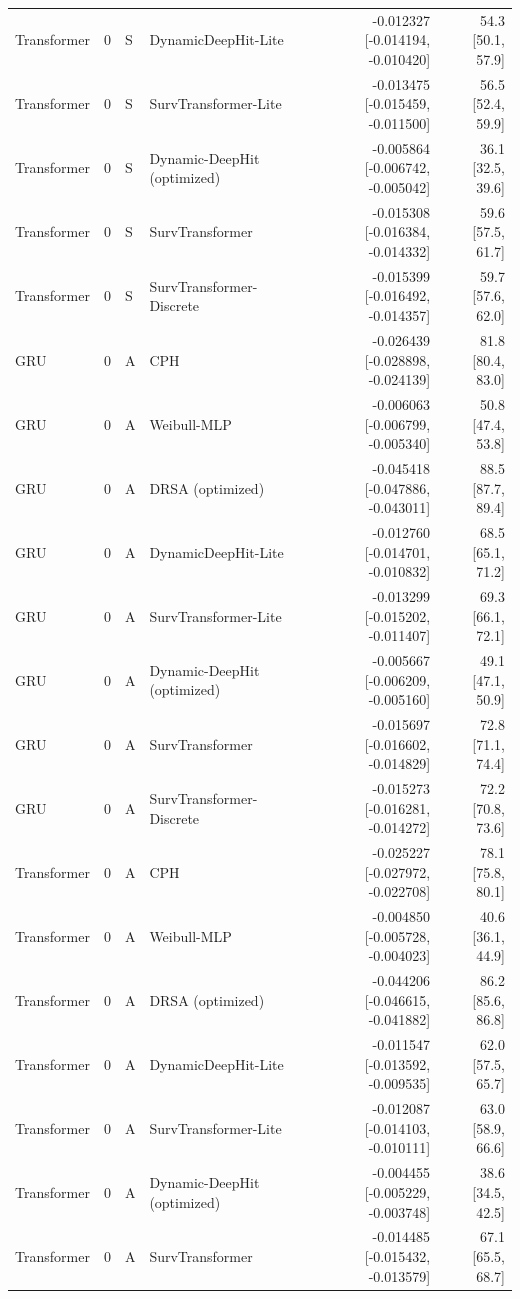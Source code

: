 \begin{longtable}{lll p{3.0cm} rr}
Transformer & 0 & S & DynamicDeepHit-Lite & -0.012327 [-0.014194, -0.010420] & 54.3 [50.1, 57.9]\\
Transformer & 0 & S & SurvTransformer-Lite & -0.013475 [-0.015459, -0.011500] & 56.5 [52.4, 59.9]\\
Transformer & 0 & S & Dynamic-DeepHit (optimized) & -0.005864 [-0.006742, -0.005042] & 36.1 [32.5, 39.6]\\
Transformer & 0 & S & SurvTransformer & -0.015308 [-0.016384, -0.014332] & 59.6 [57.5, 61.7]\\
Transformer & 0 & S & SurvTransformer-Discrete & -0.015399 [-0.016492, -0.014357] & 59.7 [57.6, 62.0]\\
GRU & 0 & A & CPH & -0.026439 [-0.028898, -0.024139] & 81.8 [80.4, 83.0]\\
GRU & 0 & A & Weibull-MLP & -0.006063 [-0.006799, -0.005340] & 50.8 [47.4, 53.8]\\
GRU & 0 & A & DRSA (optimized) & -0.045418 [-0.047886, -0.043011] & 88.5 [87.7, 89.4]\\
GRU & 0 & A & DynamicDeepHit-Lite & -0.012760 [-0.014701, -0.010832] & 68.5 [65.1, 71.2]\\
GRU & 0 & A & SurvTransformer-Lite & -0.013299 [-0.015202, -0.011407] & 69.3 [66.1, 72.1]\\
GRU & 0 & A & Dynamic-DeepHit (optimized) & -0.005667 [-0.006209, -0.005160] & 49.1 [47.1, 50.9]\\
GRU & 0 & A & SurvTransformer & -0.015697 [-0.016602, -0.014829] & 72.8 [71.1, 74.4]\\
GRU & 0 & A & SurvTransformer-Discrete & -0.015273 [-0.016281, -0.014272] & 72.2 [70.8, 73.6]\\
Transformer & 0 & A & CPH & -0.025227 [-0.027972, -0.022708] & 78.1 [75.8, 80.1]\\
Transformer & 0 & A & Weibull-MLP & -0.004850 [-0.005728, -0.004023] & 40.6 [36.1, 44.9]\\
Transformer & 0 & A & DRSA (optimized) & -0.044206 [-0.046615, -0.041882] & 86.2 [85.6, 86.8]\\
Transformer & 0 & A & DynamicDeepHit-Lite & -0.011547 [-0.013592, -0.009535] & 62.0 [57.5, 65.7]\\
Transformer & 0 & A & SurvTransformer-Lite & -0.012087 [-0.014103, -0.010111] & 63.0 [58.9, 66.6]\\
Transformer & 0 & A & Dynamic-DeepHit (optimized) & -0.004455 [-0.005229, -0.003748] & 38.6 [34.5, 42.5]\\
Transformer & 0 & A & SurvTransformer & -0.014485 [-0.015432, -0.013579] & 67.1 [65.5, 68.7]\\

\end{longtable}
